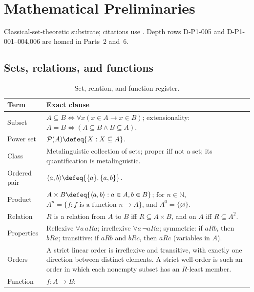 \chapter{Mathematical Preliminaries}
\label{sec:p01-mathematical-preliminaries}
Classical-set-theoretic substrate; citations use \cite{Jech2003}.  Depth rows
D-P1-005 and D-P1-001--004,006 are homed in Parts~2 and~6.
\section{Sets, relations, and functions}
\label{sec:p01-sets-relations-functions}
\begingroup\small
\begin{longtable}{@{}p{}p{}@{}}
\caption{Set, relation, and function register.}\label{tab:p01-set-function-register}\\
\toprule Term & Exact clause \\ \midrule
Subset\index{subset} & \(A\subseteq B\iff\forall x(x\in A\to x\in B)\);
extensionality: \(A=B\iff(A\subseteq B\land B\subseteq A)\). \\
Power set\index{power set} & \(\mathcal P(A)\defeq\{X:X\subseteq A\}\). \\
Class\index{class}\index{proper class} & Metalinguistic collection of sets;
proper iff not a set; its quantification is metalinguistic. \\
Ordered pair\index{ordered pair} &
\(\langle a,b\rangle\defeq\{\{a\},\{a,b\}\}\). \\
Product\index{Cartesian product} &
\(A\times B\defeq\{\langle a,b\rangle:a\in A,b\in B\}\); for
\(n\in\mathbb N\),
\(A^n=\{f:f\text{ is a function }n\to A\}\), and
\(A^0=\{\varnothing\}\). \\
Relation\index{binary relation} & \(R\) is a relation from \(A\) to \(B\)
iff \(R\subseteq A\times B\), and on \(A\) iff \(R\subseteq A^2\). \\
Properties\index{relation!properties} & Reflexive \(\forall a\,aRa\);
irreflexive \(\forall a\,\neg aRa\); symmetric: if \(aRb\), then \(bRa\);
transitive: if \(aRb\) and \(bRc\), then \(aRc\) (variables in \(A\)). \\
Orders\index{strict linear order}\index{well-order} & A strict linear order is
irreflexive and transitive, with exactly one direction between distinct
elements.  A strict well-order is such an order in which each nonempty subset
has an \(R\)-least member. \\
Function\index{function}\index{range of a function} & \(f:A\to B\):

\end{longtable}
